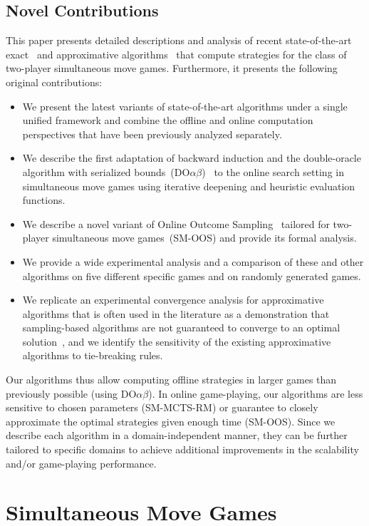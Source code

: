 \documentclass[preprint,12pt]{elsarticle}
\newcommand{\reviewchangeT}[1]{{\color{blue}#1}}
\newcommand{\doab}[0]{\textrm{DO}\alpha\beta}
\begin{document}
\reviewchangeT{
\subsection{Novel Contributions}
\label{sec:contrib}

This paper presents detailed descriptions and analysis of recent state-of-the-art exact~\cite{Bosansky13Using} and approximative
algorithms~\cite{Lanctot13Goofspiel,lisy2013-nips,15aamas-iioos} that compute strategies for the class of two-player simultaneous move games.
Furthermore, it presents the following original contributions:
\begin{itemize}
\item We present the latest variants of state-of-the-art algorithms under a single unified framework and combine the offline and online computation perspectives that have been previously analyzed separately.
\item We describe the first adaptation of backward induction and the double-oracle algorithm with serialized bounds~($\doab$)~\cite{Bosansky13Using} to the online search setting in simultaneous move games using iterative deepening and heuristic evaluation functions.
\item We describe a novel variant of Online Outcome Sampling~\cite{15aamas-iioos} tailored for two-player simultaneous move games~(SM-OOS) and provide its formal analysis.
\item We provide a wide experimental analysis and a comparison of these and other algorithms on five different specific games and on randomly generated games.
\item We replicate an experimental convergence analysis for approximative algorithms that is often used in the literature as a demonstration that sampling-based algorithms are not guaranteed to converge to an optimal solution~\cite{Shafiei09}, and we identify the sensitivity of the existing approximative algorithms to tie-breaking rules.
\end{itemize}
Our algorithms thus allow computing offline strategies in larger games than previously possible (using $\doab$). In online game-playing, our algorithms are less sensitive to chosen parameters (SM-MCTS-RM) or guarantee to closely approximate the optimal strategies given enough time (SM-OOS). Since we describe each algorithm in a domain-independent manner, they can be further tailored to specific domains to achieve additional improvements in the scalability and/or game-playing performance.
}


\section{Simultaneous Move Games}  \label{sec:smg}
\end{document}
